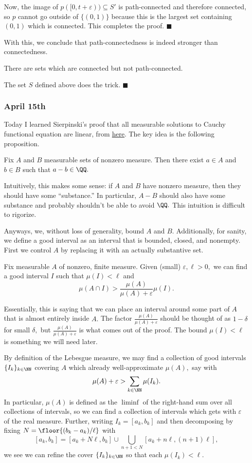 Now, the image of $p([0,t+\varepsilon))\subseteq S'$ is path-connected and therefore connected, so $p$ cannot go outside of $\{(0,1)\}$ because this is the largest set containing $(0,1)$ which is connected. This completes the proof. $\blacksquare$

With this, we conclude that path-connectedness is indeed stronger than connectedness.
\begin{theorem}
    There are sets which are connected but not path-connected.
\end{theorem}
The set $S$ defined above does the trick. $\blacksquare$

\subsubsection{April 15th}
Today I learned Sierpinski's proof that all measurable solutions to Cauchy functional equation are linear, from \href{https://web.archive.org/web/20200717011210/http://www.artsci.kyushu-u.ac.jp/~ssaito/eng/maths/Cauchy.pdf}{here}. The key idea is the following proposition.
\begin{proposition}
    Fix $A$ and $B$ measurable sets of nonzero measure. Then there exist $a\in A$ and $b\in B$ such that $a-b\in\QQ.$
\end{proposition}
Intuitively, this makes some sense: if $A$ and $B$ have nonzero measure, then they should have some ``substance.'' In particular, $A-B$ should also have some substance and probably shouldn't be able to avoid $\QQ.$ This intuition is difficult to rigorize.

Anyways, we, without loss of generality, bound $A$ and $B.$ Additionally, for sanity, we define a good interval as an interval that is bounded, closed, and nonempty. First we control $A$ by replacing it with an actually substantive set.
\begin{lemma}
    Fix measurable $A$ of nonzero, finite measure. Given (small) $\varepsilon,\ell>0,$ we can find a good interval $I$ such that $\mu(I)<\ell$ and
    \[\mu(A\cap I)>\frac{\mu(A)}{\mu(A)+\varepsilon}\mu(I).\]
\end{lemma}
Essentially, this is saying that we can place an interval around some part of $A$ that is almost entirely inside $A.$ The factor $\frac{\mu(A)}{\mu(A)+\varepsilon}$ should be thought of as $1-\delta$ for small $\delta,$ but $\frac{\mu(A)}{\mu(A)+\varepsilon}$ is what comes out of the proof. The bound $\mu(I)<\ell$ is something we will need later.

By definition of the Lebesgue measure, we may find a collection of good intervals $\{I_k\}_{k\in\NN}$ covering $A$ which already well-approximate $\mu(A),$ say with
\[\mu(A)+\varepsilon>\sum_{k\in\NN}\mu(I_k).\]
In particular, $\mu(A)$ is defined as the $\liminf$ of the right-hand sum over all collections of intervals, so we can find a collection of intervals which gets with $\varepsilon$ of the real measure. Further, writing $I_k=[a_k,b_k]$ and then decomposing by fixing $N=\floor{(b_k-a_k)/\ell}$ with
\[[a_k,b_k]=[a_k+N\ell,b_k]\cup\bigcup_{n+1<N}[a_k+n\ell,(n+1)\ell],\]
we see we can refine the cover $\{I_k\}_{k\in\NN}$ so that each $\mu(I_k)<\ell.$

